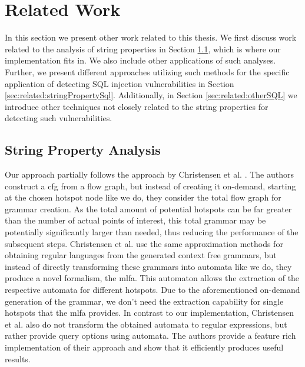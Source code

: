 \chapter{Related Work}
\label{chapter:RelatedWork}

In this section we present other work related to this thesis. We first discuss work related to the analysis of string properties in Section \ref{sec:related:stringproperty}, which is where our implementation fits in. We also include other applications of such analyses. Further, we present different approaches utilizing such methods for the specific application of detecting SQL injection vulnerabilities in Section \ref{sec:related:stringPropertySql}. Additionally, in Section \ref{sec:related:otherSQL} we introduce other techniques not closely related to the string properties for detecting such vulnerabilities.


\section{String Property Analysis}\label{sec:related:stringproperty}

Our approach partially follows the approach by Christensen et al. \cite{brics}. The authors construct a \acl{cfg} from a flow graph, but instead of creating it on-demand, starting at the chosen hotspot node like we do, they consider the total flow graph for grammar creation.
As the total amount of potential hotspots can be far greater than the number of actual points of interest, this total grammar may be potentially significantly larger than needed, thus reducing the performance of the subsequent steps.
Christensen et al. use the same approximation methods for obtaining regular languages from the generated context free grammars, but instead of directly transforming these grammars into automata like we do, they produce a novel formalism, the \ac{mlfa}.
This automaton allows the extraction of the respective automata for different hotspots. Due to the aforementioned on-demand generation of the grammar, we don't need the extraction capability for single hotspots that the \ac{mlfa} provides. In contrast to our implementation, Christensen et al. also do not transform the obtained automata to regular expressions, but rather provide query options using automata.
The authors provide a feature rich implementation of their approach and show that it efficiently produces useful results.

